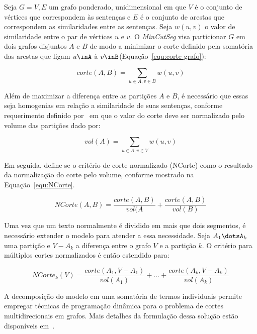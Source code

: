 Seja $G = {V,E}$ um grafo ponderado, unidimensional em que $V$ é o conjunto de vértices que correspondem às sentenças e $E$ é o conjunto de arestas que correspondem as similaridades entre as sentenças. Seja $w(u, v)$ o valor de similaridade entre o par de vértices $u$ e $v$. O \textit{MinCutSeg} visa particionar $G$ em dois grafos disjuntos $A$ e $B$ de modo a minimizar o corte definido pela somatória das arestas que ligam $u\inA$ à $v\inB$(Equação~\ref{equ:corte-grafo}):

\begin{equation} 
	corte(A,B) = \sum_{u \in A,v \in B} w(u, v) 
	\label{equ:corte-grafo}
\end{equation}



Além de maximizar a diferença entre as partições $A$ e $B$, é necessário que essas seja homogenias em relação a similaridade de suas sentenças, conforme requerimento definido por~\cite{Shi2000} em que o valor do corte deve ser normalizado pelo volume das partições dado por:

\begin{equation}
	vol(A) = \sum_{u \in A, v \in V} w(u, v)
\end{equation}


Em seguida, define-se o critério de corte normalizado (NCorte) como o resultado da normalização do corte pelo volume, conforme mostrado na Equação~\ref{equ:NCorte}.

\begin{equation}
	NCorte(A,B) = \frac{corte(A,B)}{vol(A} + \frac{corte(A,B)}{vol(B)}
	\label{equ:NCorte}
\end{equation}


Uma vez que um texto normalmente é dividido em mais que dois segmentos, é necessário extender o modelo para atender a essa necessidade. Seja $A_1\dotsA_k$ uma partição e $V - A_k$ a diferença entre o grafo $V$ e a partição $k$. O critério para múltiplos cortes normalizados é então estendido para: 

\begin{equation} 
	NCorte_k(V) = \frac{corte(A_1, V-A_1)}{vol(A_1)} + \dots + \frac{corte(A_k, V-A_k)}{vol(A_k)} 
	\label{equ:NCorte-k}
\end{equation}


A decomposição do modelo em uma somatória de termos individuais permite empregar técnicas de programação dinâmica para o problema de cortes multidirecionais em grafos. Mais detalhes da formulação dessa solução estão disponíveis em~\cite{Malioutov:2006a}.

